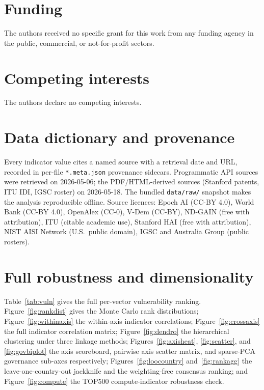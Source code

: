 \documentclass[11pt]{article}
\begin{document}
\section*{Funding}
The authors received no specific grant for this work from any funding agency in the public, commercial, or not-for-profit sectors.

\section*{Competing interests}
The authors declare no competing interests.




\appendix
\section{Data dictionary and provenance}\label{app:data}
Every indicator value cites a named source with a retrieval date and URL, recorded in per-file \texttt{*.meta.json} provenance sidecars. Programmatic API sources were retrieved on 2026-05-06; the PDF/HTML-derived sources (Stanford patents, ITU IDI, IGSC roster) on 2026-05-18. The bundled \texttt{data/raw/} snapshot makes the analysis reproducible offline. Source licences: Epoch AI (CC-BY 4.0), World Bank (CC-BY 4.0), OpenAlex (CC-0), V-Dem (CC-BY), ND-GAIN (free with attribution), ITU (citable academic use), Stanford HAI (free with attribution), NIST AISI Network (U.S.\ public domain), IGSC and Australia Group (public rosters).

\section{Full robustness and dimensionality}\label{app:robust}
Table~\ref{tab:vuln} gives the full per-vector vulnerability ranking. Figure~\ref{fig:rankdist} gives the Monte Carlo rank distributions; Figure~\ref{fig:withinaxis} the within-axis indicator correlations; Figure~\ref{fig:crossaxis} the full indicator correlation matrix; Figure~\ref{fig:dendro} the hierarchical clustering under three linkage methods; Figures~\ref{fig:axisheat}, \ref{fig:scatter}, and \ref{fig:govbiplot} the axis scoreboard, pairwise axis scatter matrix, and sparse-PCA governance sub-axes respectively; Figures~\ref{fig:loocountry} and~\ref{fig:rankagg} the leave-one-country-out jackknife and the weighting-free consensus ranking; and Figure~\ref{fig:compute} the TOP500 compute-indicator robustness check.
\end{document}
